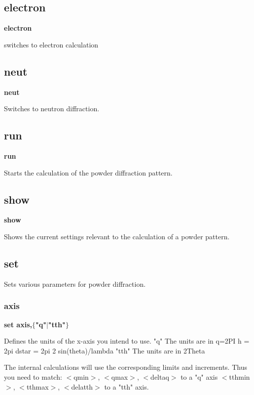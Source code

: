 \subsection*{electron}
{\bf electron \par }
\par
\vspace{3pt}
switches to electron calculation 
\subsection*{neut}
{\bf neut \par }
\par
\vspace{3pt}
Switches to neutron diffraction. 
\subsection*{run}
{\bf run \par }
\par
\vspace{3pt}
Starts the calculation of the powder diffraction pattern. 
\subsection*{show}
{\bf show \par }
\par
\vspace{3pt}
Shows the current settings relevant to the calculation of a 
powder pattern. 
\subsection*{set}
\par
Sets various parameters for powder diffraction. 
\par
\subsubsection{axis}
{\bf set axis,$ \{$"q"$| $"tth"$\} $ \par }
\par
\vspace{3pt}
Defines the units of the x-axis you intend to use. 
"q"    The units are in q=2PI h = 2pi dstar = 2pi 2 sin(theta)/lambda 
"tth"  The units are in 2Theta 
\par
The internal calculations will use the corresponding limits and 
increments.  Thus you need to match: 
$ <$qmin$> $,   $ <$qmax$> $,   $ <$deltaq$> $  to a "q" axis 
$ <$tthmin$> $, $ <$tthmax$> $, $ <$delatth$> $ to a "tth" axis. 
